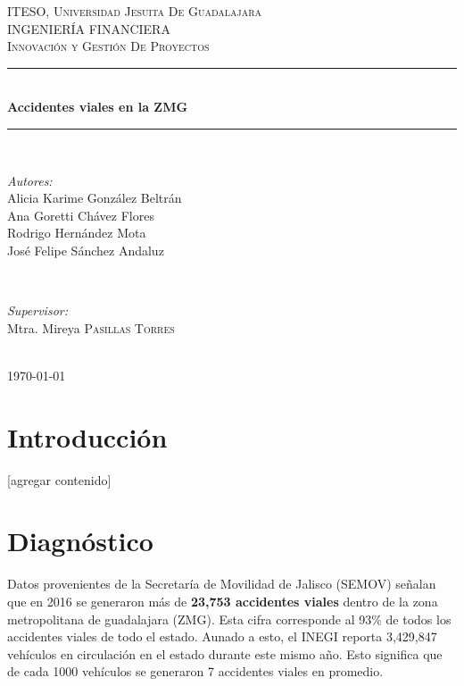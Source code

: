 \documentclass{article}
\begin{document}
\begin{titlepage}
\newcommand{\HRule}{\rule{\linewidth}{0.5mm}}

\center
\textsc{\LARGE ITESO, Universidad Jesuita De Guadalajara}\\[2cm]
\textsc{\Large INGENIERÍA FINANCIERA}\\[1cm]
\textsc{\large Innovación y Gestión De Proyectos}\\[1cm]
\HRule \\[2cm]
{ \huge \bfseries Accidentes viales en la ZMG}\\[2cm] 
\HRule \\[2cm]
\begin{minipage}{0.4\textwidth}
\begin{flushleft} \large


\emph{Autores:}\\
\small Alicia Karime González Beltrán\\
\small Ana Goretti Chávez Flores\\
\small Rodrigo Hernández Mota\\
\small José Felipe Sánchez Andaluz
\end{flushleft}
\end{minipage}
~
\begin{minipage}{0.4\textwidth}
\begin{flushright} \large
\emph{Supervisor:} \\
\small Mtra. Mireya \textsc{Pasillas Torres}
\end{flushright}
\end{minipage}\\[2cm]

{\large \today}\\[1cm]

\vfill
 
\end{titlepage}
\tableofcontents
\newpage

\section{Introducción}\label{sec:into}
[agregar contenido]

\section{Diagnóstico}\label{sec:diagnostic}

Datos provenientes de la Secretaría de Movilidad de Jalisco (SEMOV) señalan que en 2016 se generaron más de \textbf{23,753 accidentes viales} dentro de la zona metropolitana de guadalajara (ZMG). Esta cifra corresponde al 93\% de todos los accidentes viales de todo el estado. Aunado a esto, el INEGI reporta 3,429,847 vehículos en circulación en el estado durante este mismo año. Esto significa que de cada 1000 vehículos se generaron 7 accidentes viales en promedio. 
\end{document}
